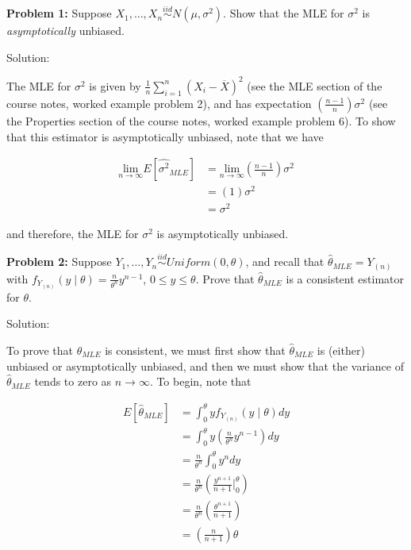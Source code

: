\documentclass[
  letterpaper,
  DIV=11,
  numbers=noendperiod]{scrreprt}
\begin{document}
\textbf{Problem 1:} Suppose
\(X_1, \dots, X_n \overset{iid}{\sim} N(\mu, \sigma^2)\). Show that the
MLE for \(\sigma^2\) is \emph{asymptotically} unbiased.

Solution:

The MLE for \(\sigma^2\) is given by
\(\frac{1}{n} \sum_{i = 1}^n (X_i - \overline{X})^2\) (see the MLE
section of the course notes, worked example problem 2), and has
expectation \(\left( \frac{n-1}{n} \right)\sigma^2\) (see the Properties
section of the course notes, worked example problem 6). To show that
this estimator is asymptotically unbiased, note that we have

\begin{align*}
    \underset{n\to \infty}{\text{lim}} E[\hat{\sigma^2}_{MLE}] & = \underset{n\to \infty}{\text{lim}} \left( \frac{n-1}{n} \right) \sigma^2 \\
    & = \left( 1 \right) \sigma^2 \\
    & = \sigma^2
\end{align*}

and therefore, the MLE for \(\sigma^2\) is asymptotically unbiased.

\textbf{Problem 2:} Suppose
\(Y_1, \dots, Y_n \overset{iid}{\sim} Uniform(0, \theta)\), and recall
that \(\hat{\theta}_{MLE} = Y_{(n)}\) with
\(f_{Y_{(n)}}(y \mid \theta) = \frac{n}{\theta^n} y^{n-1}\),
\(0 \leq y \leq \theta\). Prove that \(\hat{\theta}_{MLE}\) is a
consistent estimator for \(\theta\).

Solution:

To prove that \(\hat{\theta}_{MLE}\) is consistent, we must first show
that \(\hat{\theta}_{MLE}\) is (either) unbiased or asymptotically
unbiased, and then we must show that the variance of
\(\hat{\theta}_{MLE}\) tends to zero as \(n \to \infty\). To begin, note
that

\begin{align*}
    E\left[\hat{\theta}_{MLE}\right] & = \int_{0}^\theta y f_{Y_{(n)}} (y \mid \theta) dy \\
    & = \int_{0}^\theta y \left( \frac{n}{\theta^n} y^{n-1} \right) dy \\
    & = \frac{n}{\theta^n} \int_0^\theta y^n dy \\
    & = \frac{n}{\theta^n} \left( \frac{y^{n + 1}}{n + 1} \bigg|_0^\theta \right) \\
    & = \frac{n}{\theta^n} \left( \frac{\theta^{n + 1}}{n + 1} \right) \\
    & = \left( \frac{n}{n + 1} \right) \theta
\end{align*}
\end{document}
